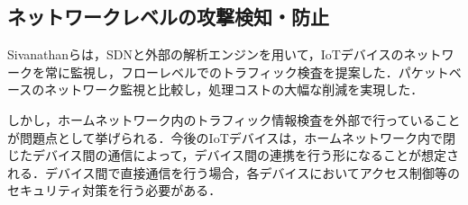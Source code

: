 \documentclass[Japanese]{dicomopapers}
\begin{document}
\subsection{ネットワークレベルの攻撃検知・防止}
Sivanathanらは，SDNと外部の解析エンジンを用いて，IoTデバイスのネットワークを常に監視し，フローレベルでのトラフィック検査を提案した\cite{lowcost}．パケットベースのネットワーク監視と比較し，処理コストの大幅な削減を実現した．\par
しかし，ホームネットワーク内のトラフィック情報検査を外部で行っていることが問題点として挙げられる．今後のIoTデバイスは，ホームネットワーク内で閉じたデバイス間の通信によって，デバイス間の連携を行う形になることが想定される\cite{d2d}．デバイス間で直接通信を行う場合，各デバイスにおいてアクセス制御等のセキュリティ対策を行う必要がある．

\end{document}
